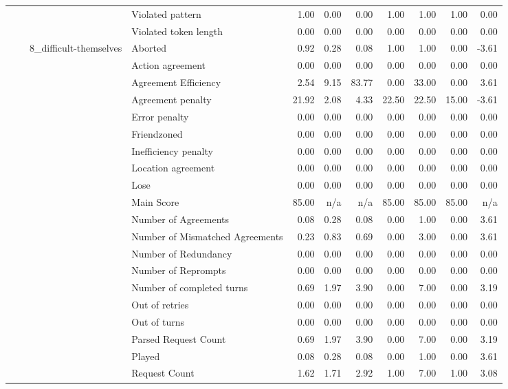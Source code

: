 \begin{tabular}{llllrrrrrrr}
 &  &  & Violated pattern & 1.00 & 0.00 & 0.00 & 1.00 & 1.00 & 1.00 & 0.00 \\
 &  &  & Violated token length & 0.00 & 0.00 & 0.00 & 0.00 & 0.00 & 0.00 & 0.00 \\
\cline{3-11}
 &  & \multirow[t]{27}{*}{8_difficult-themselves} & Aborted & 0.92 & 0.28 & 0.08 & 1.00 & 1.00 & 0.00 & -3.61 \\
 &  &  & Action agreement & 0.00 & 0.00 & 0.00 & 0.00 & 0.00 & 0.00 & 0.00 \\
 &  &  & Agreement Efficiency & 2.54 & 9.15 & 83.77 & 0.00 & 33.00 & 0.00 & 3.61 \\
 &  &  & Agreement penalty & 21.92 & 2.08 & 4.33 & 22.50 & 22.50 & 15.00 & -3.61 \\
 &  &  & Error penalty & 0.00 & 0.00 & 0.00 & 0.00 & 0.00 & 0.00 & 0.00 \\
 &  &  & Friendzoned & 0.00 & 0.00 & 0.00 & 0.00 & 0.00 & 0.00 & 0.00 \\
 &  &  & Inefficiency penalty & 0.00 & 0.00 & 0.00 & 0.00 & 0.00 & 0.00 & 0.00 \\
 &  &  & Location agreement & 0.00 & 0.00 & 0.00 & 0.00 & 0.00 & 0.00 & 0.00 \\
 &  &  & Lose & 0.00 & 0.00 & 0.00 & 0.00 & 0.00 & 0.00 & 0.00 \\
 &  &  & Main Score & 85.00 & n/a & n/a & 85.00 & 85.00 & 85.00 & n/a \\
 &  &  & Number of Agreements & 0.08 & 0.28 & 0.08 & 0.00 & 1.00 & 0.00 & 3.61 \\
 &  &  & Number of Mismatched Agreements & 0.23 & 0.83 & 0.69 & 0.00 & 3.00 & 0.00 & 3.61 \\
 &  &  & Number of Redundancy & 0.00 & 0.00 & 0.00 & 0.00 & 0.00 & 0.00 & 0.00 \\
 &  &  & Number of Reprompts & 0.00 & 0.00 & 0.00 & 0.00 & 0.00 & 0.00 & 0.00 \\
 &  &  & Number of completed turns & 0.69 & 1.97 & 3.90 & 0.00 & 7.00 & 0.00 & 3.19 \\
 &  &  & Out of retries & 0.00 & 0.00 & 0.00 & 0.00 & 0.00 & 0.00 & 0.00 \\
 &  &  & Out of turns & 0.00 & 0.00 & 0.00 & 0.00 & 0.00 & 0.00 & 0.00 \\
 &  &  & Parsed Request Count & 0.69 & 1.97 & 3.90 & 0.00 & 7.00 & 0.00 & 3.19 \\
 &  &  & Played & 0.08 & 0.28 & 0.08 & 0.00 & 1.00 & 0.00 & 3.61 \\
 &  &  & Request Count & 1.62 & 1.71 & 2.92 & 1.00 & 7.00 & 1.00 & 3.08 \\

\end{tabular}
